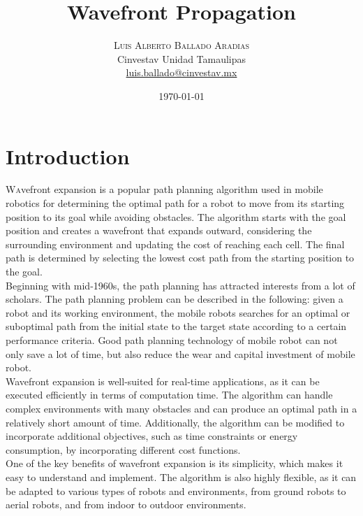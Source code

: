 \documentclass[oneside,twocolumn]{article}
\title{Wavefront Propagation} %
\author{%
\textsc{Luis Alberto Ballado Aradias} \\%
\normalsize Cinvestav Unidad Tamaulipas \\ %
\normalsize \href{mailto:luis.ballado@cinvestav.mx}{luis.ballado@cinvestav.mx} %
}
\date{\today} %
\begin{document}
\maketitle



    
\section{Introduction}

\lettrine[nindent=0em,lines=3]{W} avefront expansion is a popular path planning algorithm used in mobile robotics for determining the optimal path for a robot to move from its starting position to its goal while avoiding obstacles. The algorithm starts with the goal position and creates a wavefront that expands outward, considering the surrounding environment and updating the cost of reaching each cell. The final path is determined by selecting the lowest cost path from the starting position to the goal.\\

Beginning with mid-1960s, the path planning has attracted interests from a lot of scholars. The path planning problem can be described in the following: given a robot and its working environment, the mobile robots searches for an optimal or suboptimal path from the initial state to the target state according to a certain performance criteria. Good path planning technology of mobile robot can not only save a lot of time, but also reduce the wear and capital investment of mobile robot.\\

Wavefront expansion is well-suited for real-time applications, as it can be executed efficiently in terms of computation time. The algorithm can handle complex environments with many obstacles and can produce an optimal path in a relatively short amount of time. Additionally, the algorithm can be modified to incorporate additional objectives, such as time constraints or energy consumption, by incorporating different cost functions.\\

One of the key benefits of wavefront expansion is its simplicity, which makes it easy to understand and implement. The algorithm is also highly flexible, as it can be adapted to various types of robots and environments, from ground robots to aerial robots, and from indoor to outdoor environments. \\
\end{document}
